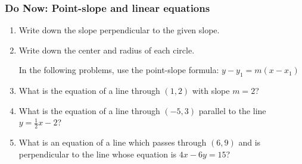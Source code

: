 \documentclass[12pt, twoside]{article}
\begin{document}
\subsubsection*{Do Now: Point-slope and linear equations}
  \begin{enumerate}

  \item Write down the slope perpendicular to the given slope. \vspace{0.5cm}
    \begin{enumerate}
    \end{enumerate}

  \item Write down the center and radius of each circle.
    \begin{enumerate}
    \end{enumerate}  \vspace{2cm}

  In the following problems, use the point-slope formula: $y-y_1=m (x-x_1)$
    \item What is the equation of a line through $(1,2)$ with slope $m=2$?  \vspace{2cm}
    \item What is the equation of a line through $(-5,3)$ parallel to the line $y=\frac{1}{2}x-2$?  \vspace{2cm}

    \item What is an equation of a line which passes through $(6,9)$ and is perpendicular to the line whose equation is $4x-6y=15$? \vspace{1cm}


  \end{enumerate}
\end{document}
